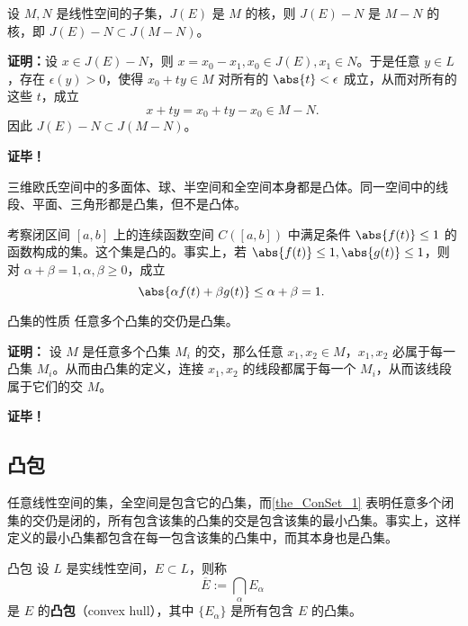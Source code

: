 \begin{theorem}{}
设 $M,N$ 是线性空间的子集，$J(E)$ 是 $M$ 的核，则 $J(E)-N$ 是 $M-N$ 的核，即 $J(E)-N\subset J(M-N)$。
\end{theorem}
\textbf{证明：}设 $x\in J(E)-N$，则 $x=x_0-x_1,x_0\in J(E),x_1\in N$。于是任意 $y\in L$，存在 $\epsilon(y)>0$，使得 $x_0+ty\in M$ 对所有的 $\abs{t}<\epsilon$ 成立，从而对所有的这些 $t$，成立
\begin{equation}
x+ty=x_0+ty-x_0\in M-N.~
\end{equation}
因此 $J(E)-N\subset J(M-N)$。

\textbf{证毕！}

\begin{example}{}
三维欧氏空间中的多面体、球、半空间和全空间本身都是凸体。同一空间中的线段、平面、三角形都是凸集，但不是凸体。
\end{example}

\begin{example}{}
考察闭区间 $[a,b]$ 上的连续函数空间 $C([a,b])$ 中满足条件 $\abs{f(t)}\leq1$ 的函数构成的集。这个集是凸的。事实上，若 $\abs{f(t)}\leq1,\abs{g(t)}\leq1$，则对 $\alpha+\beta=1,\alpha,\beta\geq0$，成立
\begin{equation}
\abs{\alpha f(t)+\beta g(t)}\leq\alpha+\beta=1.~
\end{equation}

\end{example}




\begin{theorem}{凸集的性质}\label{the_ConSet_1}
任意多个凸集的交仍是凸集。
\end{theorem}
\textbf{证明：} 设 $M$ 是任意多个凸集 $M_i$ 的交，那么任意 $x_1,x_2\in M$，$x_1,x_2$ 必属于每一凸集 $M_i$。从而由凸集的定义，连接 $x_1,x_2$ 的线段都属于每一个 $M_i$，从而该线段属于它们的交 $M$。

\textbf{证毕！} 

\subsection{凸包}
任意线性空间的集，全空间是包含它的凸集，而\autoref{the_ConSet_1} 表明任意多个闭集的交仍是闭的，所有包含该集的凸集的交是包含该集的最小凸集。事实上，这样定义的最小凸集都包含在每一包含该集的凸集中，而其本身也是凸集。
\begin{definition}{凸包}
设 $L$ 是实线性空间，$E\subset L$，则称
\begin{equation}
\overline{E}:=\bigcap_{\alpha}E_\alpha~
\end{equation}
是 $E$ 的\textbf{凸包}（convex hull），其中 $\{E_\alpha\}$ 是所有包含 $E$ 的凸集。
\end{definition}

